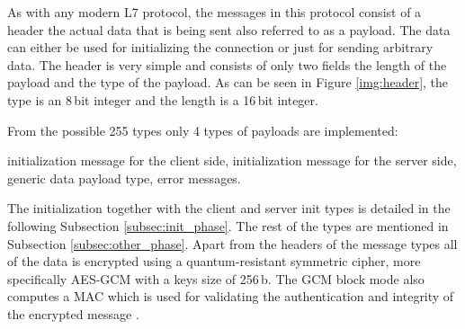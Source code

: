 As with any modern L7 protocol, the messages in this protocol consist of a header the actual data that is being sent also referred to as a payload. The data can either be used for initializing the connection or just for sending arbitrary data. The header is very simple and consists of only two fields the length of the payload and the type of the payload. As can be seen in Figure \ref{img:header}, the type is an 8\,bit integer and the length is a 16\,bit integer.

\noindent From the possible 255 types only 4 types of payloads are implemented:
\begin{itemize}
  initialization message for the client side,
  initialization message for the server side,
  generic data payload type,
  error messages.
\end{itemize}
The initialization together with the client and server init types is detailed in the following Subsection \ref{subsec:init_phase}. The rest of the types are mentioned in Subsection \ref{subsec:other_phase}. Apart from the headers of the message types all of the data is encrypted using a quantum-resistant symmetric cipher, more specifically AES-GCM with a keys size of 256\,b. The GCM block mode also computes a MAC which is used for validating the authentication and integrity of the encrypted message \cite{Paar2010}.
